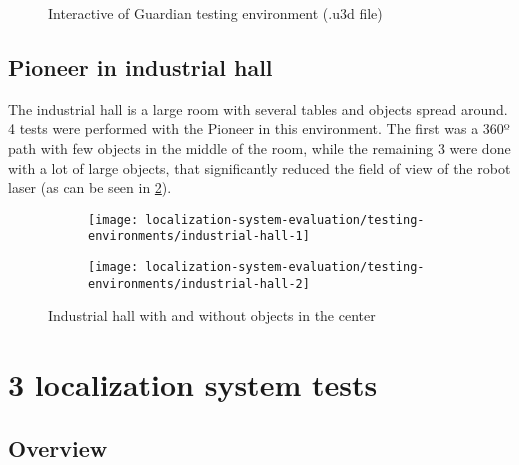 \begin{figure}[H]
	\centering
	\caption{Interactive  of Guardian testing environment (.u3d file)}
	\label{fig:localization-system-evaluation_guardian-tests-environment-interactive}
\end{figure}



\subsection{Pioneer in industrial hall}

The industrial hall is a large room with several tables and objects spread around. 4 tests were performed with the Pioneer in this environment. The first was a 360º path with few objects in the middle of the room, while the remaining 3 were done with a lot of large objects, that significantly reduced the field of view of the robot laser (as can be seen in \cref{fig:localization-system-evaluation_industrial-hall}).

\begin{figure}[H]
	\centering
	\begin{subfigure}[h]{.497\textwidth}
		\centering
		\texttt{[image: localization-system-evaluation/testing-environments/industrial-hall-1]}
	\end{subfigure}
	\begin{subfigure}[h]{.497\textwidth}
		\centering
		\texttt{[image: localization-system-evaluation/testing-environments/industrial-hall-2]}
	\end{subfigure}
	\caption{Industrial hall with and without objects in the center \cite{Sturm2012}}
	\label{fig:localization-system-evaluation_industrial-hall}
\end{figure}



\section{3  localization system tests}


\subsection{Overview}

